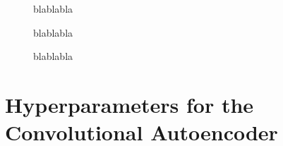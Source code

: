 \begin{center}
	\begin{figure}[htbp!]\ContinuedFloat
		\scalebox{.9}{}
		\scalebox{.9}{}
		\caption{}
	\end{figure}
\end{center}
\begin{center}
	\begin{figure}[htbp!]
		\scalebox{.9}{}
		\scalebox{.9}{}
		\scalebox{.9}{}
		\scalebox{.9}{}
		\scalebox{.9}{}
		\scalebox{.9}{}
		\caption{blablabla}
		\label{Fig:Activations Rare}
	\end{figure}
\end{center}
\begin{center}
	\begin{figure}[htbp!]\ContinuedFloat
		\scalebox{.9}{}
		\scalebox{.9}{}
		\caption{blablabla}
		\label{}
	\end{figure}
\end{center}
\begin{center}
	\begin{figure}[htbp!]
		\scalebox{.9}{}
		\scalebox{.9}{}
		\scalebox{.9}{}
		\caption{blablabla}
		\label{Fig:Activations Rare 2nd3rd}
	\end{figure}
\end{center}
\newpage
\chapter{Hyperparameters for the Convolutional Autoencoder}
\label{Ap: Convolutional}

